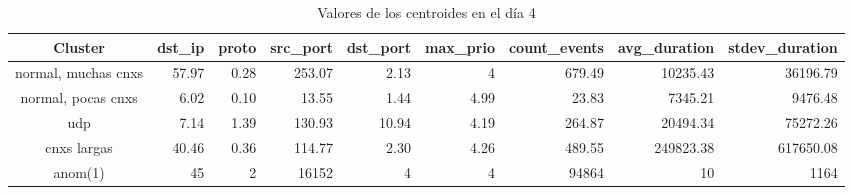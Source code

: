 \begin{table}[h]
    \begingroup
    \setlength{\tabcolsep}{2pt} %
    \hspace*{-3cm}
    \begin{tabular}{|c|r|r|r|r|r|r|r|r|}
    \hline
    \textbf{Cluster}    & \textbf{dst\_ip} & \textbf{proto} & \textbf{src\_port} & \textbf{dst\_port} & \textbf{max\_prio} & \textbf{count\_events} & \textbf{avg\_duration} & \textbf{stdev\_duration} \\ \hline
    normal, muchas cnxs & 57.97            & 0.28           & 253.07             & 2.13               & 4                  & 679.49                 & 10235.43               & 36196.79                 \\ \hline
    normal, pocas cnxs  & 6.02             & 0.10           & 13.55              & 1.44               & 4.99               & 23.83                  & 7345.21                & 9476.48                  \\ \hline
    udp                 & 7.14             & 1.39           & 130.93             & 10.94              & 4.19               & 264.87                 & 20494.34               & 75272.26                 \\ \hline
    cnxs largas         & 40.46            & 0.36           & 114.77             & 2.30               & 4.26               & 489.55                 & 249823.38              & 617650.08                \\ \hline
    anom(1)             & 45               & 2              & 16152              & 4                  & 4                  & 94864                  & 10                     & 1164                     \\ \hline
    \end{tabular}
    \endgroup
\caption{Valores de los centroides en el día 4}
\label{tab:dia4}
\end{table}

